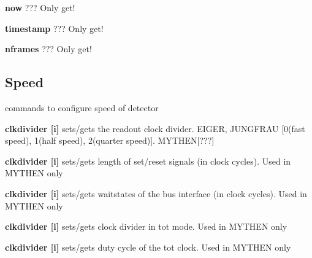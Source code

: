 \begin{DoxyItemize}
\item {\bfseries now} ??? Only get!
\end{DoxyItemize}


\begin{DoxyItemize}
\item {\bfseries timestamp} ??? Only get!
\end{DoxyItemize}


\begin{DoxyItemize}
\item {\bfseries nframes} ??? Only get!
\end{DoxyItemize}\hypertarget{config_configspeed}{}\subsection{Speed}\label{config_configspeed}
commands to configure speed of detector


\begin{DoxyItemize}
\item {\bfseries clkdivider \mbox{[}i\mbox{]}} sets/gets the readout clock divider. EIGER, JUNGFRAU \mbox{[}0(fast speed), 1(half speed), 2(quarter speed)\mbox{]}. MYTHEN\mbox{[}???\mbox{]}
\end{DoxyItemize}


\begin{DoxyItemize}
\item {\bfseries clkdivider \mbox{[}i\mbox{]}} sets/gets length of set/reset signals (in clock cycles). Used in MYTHEN only
\end{DoxyItemize}


\begin{DoxyItemize}
\item {\bfseries clkdivider \mbox{[}i\mbox{]}} sets/gets waitstates of the bus interface (in clock cycles). Used in MYTHEN only
\end{DoxyItemize}


\begin{DoxyItemize}
\item {\bfseries clkdivider \mbox{[}i\mbox{]}} sets/gets clock divider in tot mode. Used in MYTHEN only
\end{DoxyItemize}


\begin{DoxyItemize}
\item {\bfseries clkdivider \mbox{[}i\mbox{]}} sets/gets duty cycle of the tot clock. Used in MYTHEN only
\end{DoxyItemize}


